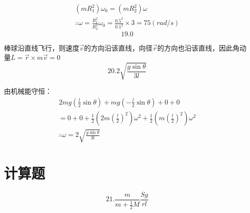 \documentclass[b5paper,opensource]{./template/qyxf-book}
\begin{document}
		\begin{gather*}
		(mR_1^2)\omega_0=(mR_2^2)\omega\\
		\therefore \omega=\frac{R_1^2}{R_2^2}\omega_0=\frac{0.5^2}{0.1^2}\times 3=75(rad/s)
		\end{gather*}
		\[19.0\]\par
		棒球沿直线飞行，则速度$ \vec{v} $的方向沿该直线，向径$ \vec{r} $的方向也沿该直线，因此角动量$ L=\vec{r}\times m\vec{v}=0 $
		\[20.2\sqrt{\frac{g\sin\theta}{3l}}\]\par
		由机械能守恒：
		\begin{gather*}
		\hspace{1pt}2mg\left(\frac{l}{2}\sin\theta\right)+mg\left(-\frac{l}{2}\sin\theta\right)+0+0\\
		=0+0+\frac{1}{2}\left(2m\left(\frac{l}{2}\right)^2\right)\omega^2+\frac{1}{2}\left(m\left(\frac{l}{2}\right)^2\right)\omega^2\\
		\therefore \omega=2\sqrt{\frac{g\sin\theta}{3l}}
		\end{gather*}
	\section{计算题}
		\[21.\frac{m}{m+\frac{1}{2}M}\frac{Sg}{rl}\] 
		
\end{document}
